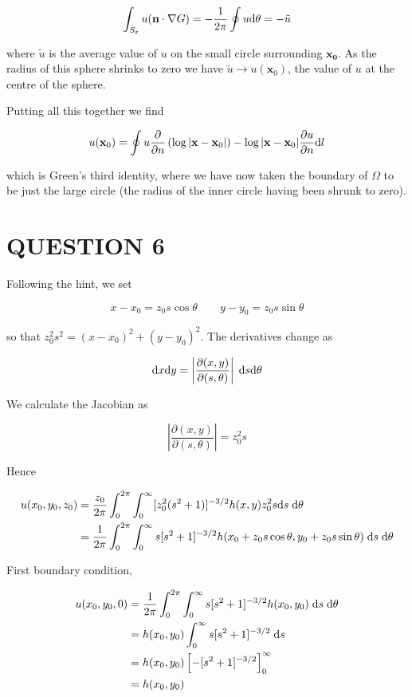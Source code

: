 \documentclass[a4paper]{article}
\begin{document}
\[ \int_{S_{\varepsilon}} u ( \mathbf{n} \cdot \nabla G ) = - \frac{1}{2\pi }\oint u \mathrm{d} \theta = - \tilde{u}  \]

where $ \tilde{u} $ is the average value of $ u $ on the small circle surrounding  $ \mathbf{x_{0}} $. As the radius of this sphere shrinks to zero we have $ \tilde{u} \to u(\mathbf{x}_{0}) $, the value of $ u $ at the centre of the sphere. 

Putting all this together we find

\[ u(\mathbf{x}_{0}) = \oint u \frac{\partial }{\partial n} \left(  \log| \mathbf{x} - \mathbf{x}_{0} |   \right) -  \log| \mathbf{x} - \mathbf{x}_{0} |  \frac{\partial u }{\partial n} \mathrm{d} l  \]

which is Green's third identity, where we have now taken the boundary of $ \Omega $ to be just the large circle (the radius of the inner circle having been shrunk to zero).







\section{QUESTION 6}

Following the hint, we set

\[ x - x_{0} = z_{0} s \cos \theta \qquad y - y_{0} = z_{0} s \sin \theta \]

so that $ z_{0}^{2}s^{2} = (x-x_{0})^{2} + (y - y_{0})^{2} $. The derivatives change as 

\[ \mathrm{d} x \mathrm{d} y = \left| \frac{\partial (x,y)}{\partial(s,\theta)} \right|\; \mathrm{d} s \mathrm{d} \theta \]

We calculate the Jacobian as 

\[ \left| \frac{\partial (x,y)}{\partial(s,\theta)} \right| = z_{0}^{2} s \]

Hence

\begin{align*}
u(x_{0},y_{0},z_{0})& = \frac{z_{0}}{2\pi} \int_{0}^{2\pi} \int_{0}^{\infty} [z_{0}^{2}(s^{2} + 1)]^{-3/2} h(x,y) z_{0}^{2} s \mathrm{d} s \; \mathrm{d} \theta  \\
& = \frac{1}{2\pi} \int_{0}^{2\pi} \int_{0}^{\infty} s[s^{2} + 1]^{-3/2} h(x_{0} + z_{0} s \cos \theta, y_{0} + z_{0} s \sin \theta) \; \mathrm{d} s \; \mathrm{d} \theta \\
\end{align*}

First boundary condition,


\begin{align*}
u(x_{0},y_{0},0) & = \frac{1}{2\pi} \int_{0}^{2\pi} \int_{0}^{\infty} s[s^{2} + 1]^{-3/2} h(x_{0}, y_{0}) \; \mathrm{d} s \; \mathrm{d} \theta \\
& = h(x_{0},y_{0}) \int_{0}^{\infty} s[s^{2} + 1]^{-3/2} \; \mathrm{d} s \\
& = h(x_{0},y_{0}) \left[ - [s^{2} + 1]^{-3/2} \right]_{0}^{\infty} \\
& = h(x_{0},y_{0})
\end{align*}
\end{document}

